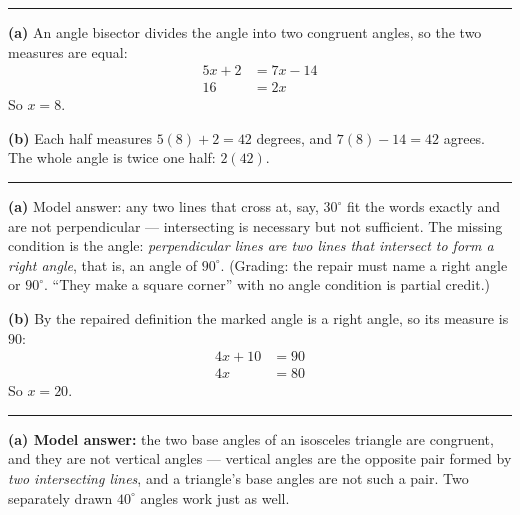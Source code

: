 \documentclass[12pt]{article}
\begin{document}
\vspace{0.2cm}\noindent\rule{\linewidth}{0.2pt}


\textbf{(a)} An angle bisector divides the angle into two congruent angles, so the two measures are equal:
\begin{align*}
  5x + 2 &= 7x - 14 \\
  16 &= 2x
\end{align*}
So $x = 8$. 

\textbf{(b)} Each half measures $5(8) + 2 = 42$ degrees, and $7(8) - 14 = 42$ agrees. The whole angle is twice one half: $2(42)$. 

\vspace{0.2cm}\noindent\rule{\linewidth}{0.2pt}


\textbf{(a)} Model answer: any two lines that cross at, say, $30^\circ$ fit the words exactly and are not perpendicular --- intersecting is necessary but not sufficient. The missing condition is the angle: \emph{perpendicular lines are two lines that intersect to form a right angle}, that is, an angle of $90^\circ$. (Grading: the repair must name a right angle or $90^\circ$. ``They make a square corner'' with no angle condition is partial credit.)

\textbf{(b)} By the repaired definition the marked angle is a right angle, so its measure is $90$:
\begin{align*}
  4x + 10 &= 90 \\
  4x &= 80
\end{align*}
So $x = 20$. 

\vspace{0.2cm}\noindent\rule{\linewidth}{0.2pt}


\textbf{(a) Model answer:} the two base angles of an isosceles triangle are congruent, and they are not vertical angles --- vertical angles are the opposite pair formed by \emph{two intersecting lines}, and a triangle's base angles are not such a pair. Two separately drawn $40^\circ$ angles work just as well.
\end{document}
